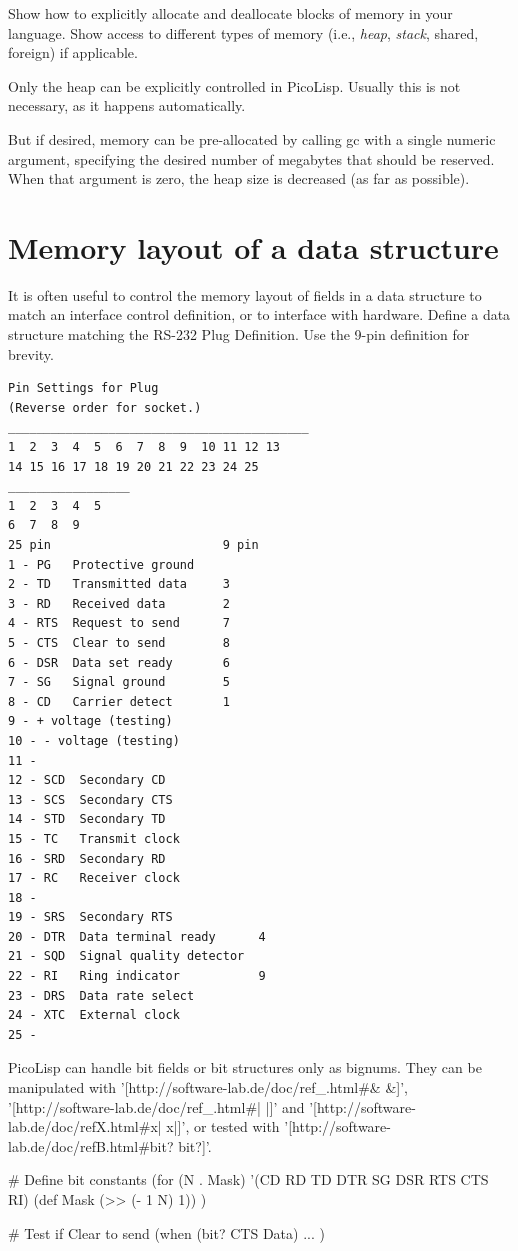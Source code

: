 Show how to explicitly allocate and deallocate blocks of memory in your
language. Show access to different types of memory (i.e.,
\emph{heap}, \emph{stack}, shared,
foreign) if applicable.


\begin{wideverbatim}

Only the heap can be explicitly controlled in PicoLisp. Usually this is not
necessary, as it happens automatically.

But if desired, memory can be pre-allocated by calling gc with a single numeric
argument, specifying the desired number of megabytes that should be reserved.
When that argument is zero, the heap size is decreased (as far as possible).

\end{wideverbatim}

\pagebreak{}
\section*{Memory layout of a data structure}

It is often useful to control the memory layout of fields in a data
structure to match an interface control definition, or to interface with
hardware. Define a data structure matching the RS-232 Plug Definition.
Use the 9-pin definition for brevity.

\begin{verbatim}
Pin Settings for Plug
(Reverse order for socket.)
__________________________________________
1  2  3  4  5  6  7  8  9  10 11 12 13
14 15 16 17 18 19 20 21 22 23 24 25
_________________
1  2  3  4  5
6  7  8  9
25 pin                        9 pin
1 - PG   Protective ground
2 - TD   Transmitted data     3
3 - RD   Received data        2
4 - RTS  Request to send      7
5 - CTS  Clear to send        8
6 - DSR  Data set ready       6
7 - SG   Signal ground        5
8 - CD   Carrier detect       1
9 - + voltage (testing)
10 - - voltage (testing)
11 -
12 - SCD  Secondary CD
13 - SCS  Secondary CTS
14 - STD  Secondary TD
15 - TC   Transmit clock
16 - SRD  Secondary RD
17 - RC   Receiver clock
18 -
19 - SRS  Secondary RTS            
20 - DTR  Data terminal ready      4
21 - SQD  Signal quality detector
22 - RI   Ring indicator           9
23 - DRS  Data rate select
24 - XTC  External clock
25 -
\end{verbatim}



\begin{wideverbatim}

PicoLisp can handle bit fields or bit structures only as bignums. They can be
manipulated with '[http://software-lab.de/doc/ref_.html#\& \&]',
'[http://software-lab.de/doc/ref_.html#| |]' and
'[http://software-lab.de/doc/refX.html#x| x|]',
or tested with '[http://software-lab.de/doc/refB.html#bit? bit?]'.

# Define bit constants
(for (N . Mask) '(CD RD TD DTR SG DSR RTS CTS RI)
   (def Mask (>> (- 1 N) 1)) )

# Test if Clear to send
(when (bit? CTS Data)
   ... )

\end{wideverbatim}

